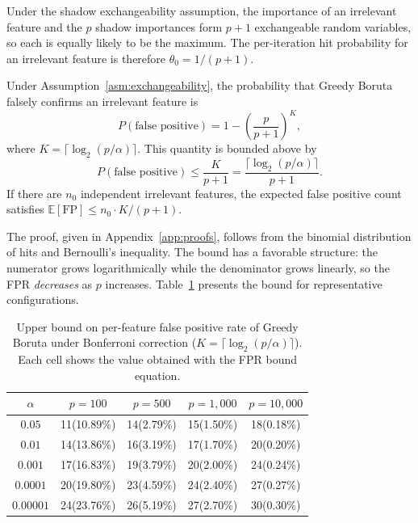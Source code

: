 \documentclass[runningheads]{llncs}
\begin{document}
Under the shadow exchangeability assumption, the importance of an irrelevant feature and the $p$ shadow importances form $p+1$ exchangeable random variables, so each is equally likely to be the maximum. The per-iteration hit probability for an irrelevant feature is therefore $\theta_0 = 1/(p+1)$.

\begin{theorem}
\label{thm:fpr}
Under Assumption~\ref{asm:exchangeability}, the probability that Greedy Boruta falsely confirms an irrelevant feature is
\begin{equation}
\label{eq:fpr_exact}
    P(\text{false positive}) = 1 - \left(\frac{p}{p+1}\right)^{K},
\end{equation}
where $K = \lceil \log_2(p/\alpha) \rceil$. This quantity is bounded above by
\begin{equation}
\label{eq:fpr_bound}
    P(\text{false positive}) \leq \frac{K}{p + 1} = \frac{\lceil \log_2(p/\alpha) \rceil}{p + 1}.
\end{equation}
If there are $n_0$ independent irrelevant features, the expected false positive count satisfies $\mathbb{E}[\text{FP}] \leq n_0 \cdot K / (p+1)$.
\end{theorem}

The proof, given in Appendix~\ref{app:proofs}, follows from the binomial distribution of hits and Bernoulli's inequality. The bound has a favorable structure: the numerator grows logarithmically while the denominator grows linearly, so the FPR \emph{decreases} as $p$ increases. Table~\ref{tab:fpr} presents the bound for representative configurations.

\begin{table}[t]
\caption{Upper bound on per-feature false positive rate of Greedy Boruta under Bonferroni correction ($K = \lceil \log_2(p/\alpha) \rceil$). Each cell shows the value obtained with the FPR bound equation.}
\label{tab:fpr}
\centering
\begin{tabular}{ccccc}
\toprule
$\alpha$ & $p = 100$ & $p = 500$ & $p = 1{,}000$ & $p = 10{,}000$ \\
\midrule
$0.05$    & 11\;\;(10.89\%) & 14\;\;(2.79\%) & 15\;\;(1.50\%) & 18\;\;(0.18\%) \\
$0.01$    & 14\;\;(13.86\%) & 16\;\;(3.19\%) & 17\;\;(1.70\%) & 20\;\;(0.20\%) \\
$0.001$   & 17\;\;(16.83\%) & 19\;\;(3.79\%) & 20\;\;(2.00\%) & 24\;\;(0.24\%) \\
$0.0001$  & 20\;\;(19.80\%) & 23\;\;(4.59\%) & 24\;\;(2.40\%) & 27\;\;(0.27\%) \\
$0.00001$ & 24\;\;(23.76\%) & 26\;\;(5.19\%) & 27\;\;(2.70\%) & 30\;\;(0.30\%) \\
\bottomrule
\end{tabular}
\end{table}
\end{document}
